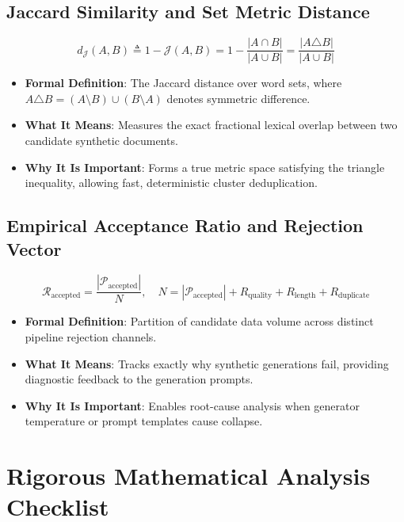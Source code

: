 \documentclass[11pt,a4paper]{article}
\theoremstyle{definition}
\begin{document}
\subsection{Jaccard Similarity and Set Metric Distance}
{\boldmath
\begin{equation}
d_{\mathcal{J}}(A, B) \triangleq 1 - \mathcal{J}(A, B) = 1 - \frac{|A \cap B|}{|A \cup B|} = \frac{|A \triangle B|}{|A \cup B|}
\end{equation}
}
\begin{itemize}
    \item \textbf{Formal Definition}: The Jaccard distance over word sets, where $A \triangle B = (A \setminus B) \cup (B \setminus A)$ denotes symmetric difference.
    \item \textbf{What It Means}: Measures the exact fractional lexical overlap between two candidate synthetic documents.
    \item \textbf{Why It Is Important}: Forms a true metric space satisfying the triangle inequality, allowing fast, deterministic cluster deduplication.
\end{itemize}

\subsection{Empirical Acceptance Ratio and Rejection Vector}
{\boldmath
\begin{equation}
\mathcal{R}_{\text{accepted}} = \frac{|\mathcal{P}_{\text{accepted}}|}{N}, \quad N = |\mathcal{P}_{\text{accepted}}| + R_{\text{quality}} + R_{\text{length}} + R_{\text{duplicate}}
\end{equation}
}
\begin{itemize}
    \item \textbf{Formal Definition}: Partition of candidate data volume across distinct pipeline rejection channels.
    \item \textbf{What It Means}: Tracks exactly why synthetic generations fail, providing diagnostic feedback to the generation prompts.
    \item \textbf{Why It Is Important}: Enables root-cause analysis when generator temperature or prompt templates cause collapse.
\end{itemize}

\section{Rigorous Mathematical Analysis Checklist}
\end{document}
